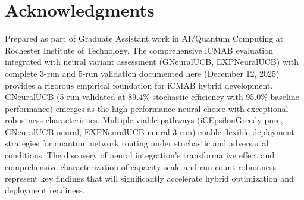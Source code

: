 \documentclass[12pt,a4paper]{article}
\begin{document}
\newpage
\section{Acknowledgments}

Prepared as part of Graduate Assistant work in AI/Quantum Computing at Rochester Institute of Technology. The comprehensive iCMAB evaluation integrated with neural variant assessment (GNeuralUCB, EXPNeuralUCB) with complete 3-run and 5-run validation documented here (December 12, 2025) provides a rigorous empirical foundation for iCMAB hybrid development. GNeuralUCB (5-run validated at 89.4\% stochastic efficiency with 95.0\% baseline performance) emerges as the high-performance neural choice with exceptional robustness characteristics. Multiple viable pathways (iCEpsilonGreedy pure, GNeuralUCB neural, EXPNeuralUCB neural 3-run) enable flexible deployment strategies for quantum network routing under stochastic and adversarial conditions. The discovery of neural integration's transformative effect and comprehensive characterization of capacity-scale and run-count robustness represent key findings that will significantly accelerate hybrid optimization and deployment readiness.
\end{document}

